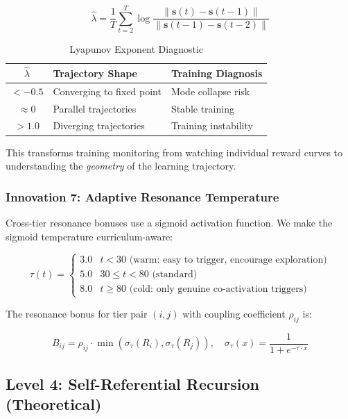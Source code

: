 \documentclass{article}
\begin{document}
\begin{equation}
    \hat{\lambda} = \frac{1}{T} \sum_{t=2}^{T} \log \frac{\|\mathbf{s}(t) - \mathbf{s}(t-1)\|}{\|\mathbf{s}(t-1) - \mathbf{s}(t-2)\|}
\end{equation}

\begin{table}[h]
\centering
\caption{Lyapunov Exponent Diagnostic}
\begin{tabular}{@{}cll@{}}
\toprule
$\hat{\lambda}$ & Trajectory Shape & Training Diagnosis \\
\midrule
$< -0.5$ & Converging to fixed point & Mode collapse risk \\
$\approx 0$ & Parallel trajectories & Stable training \\
$> 1.0$ & Diverging trajectories & Training instability \\
\bottomrule
\end{tabular}
\end{table}

This transforms training monitoring from watching individual reward curves to understanding the \emph{geometry} of the learning trajectory.

\subsubsection{Innovation 7: Adaptive Resonance Temperature}

Cross-tier resonance bonuses use a sigmoid activation function. We make the sigmoid temperature curriculum-aware:

\begin{equation}
    \tau(t) = \begin{cases}
    3.0 & t < 30 \text{ (warm: easy to trigger, encourage exploration)} \\
    5.0 & 30 \leq t < 80 \text{ (standard)} \\
    8.0 & t \geq 80 \text{ (cold: only genuine co-activation triggers)}
    \end{cases}
\end{equation}

The resonance bonus for tier pair $(i, j)$ with coupling coefficient $\rho_{ij}$ is:

\begin{equation}
    B_{ij} = \rho_{ij} \cdot \min\left(\sigma_\tau(R_i), \sigma_\tau(R_j)\right), \quad \sigma_\tau(x) = \frac{1}{1 + e^{-\tau \cdot x}}
\end{equation}

\subsection{Level 4: Self-Referential Recursion (Theoretical)}
\label{sec:ouroboros}
\end{document}
